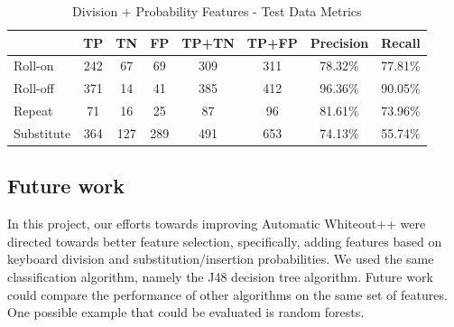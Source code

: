 \documentclass[letterpaper, 10 pt, conference]{ieeeconf}  %
\begin{document}
\begin{table}[h]
\begin{center}
\begin{tabular}{|l|c|c|c|c|c|c|c|} \hline
& TP & TN & FP & TP+TN & TP+FP & Precision & Recall \\ \hline
Roll-on & 242 & 67 & 69 & 309 & 311 & 78.32\% & 77.81\% \\ \hline
Roll-off & 371 & 14 & 41 & 385 & 412 & 96.36\% & 90.05\% \\ \hline
Repeat & 71 & 16 & 25 & 87 & 96 & 81.61\% & 73.96\% \\ \hline
Substitute & 364 & 127 & 289 & 491 & 653 & 74.13\% & 55.74\% \\ \hline
\end{tabular}
\caption{Division + Probability Features - Test Data Metrics}
\label{table:alltdm}
\end{center}
\end{table}

\subsection{Future work}

In this project, our efforts towards improving Automatic Whiteout++ were directed towards better feature selection, specifically, adding features based on keyboard division and substitution/insertion probabilities. We used the same classification algorithm, namely the J48 decision tree algorithm. Future work could compare the performance of other algorithms on the same set of features. One possible example that could be evaluated is random forests.\cite{breiman2001random}



\end{document}
